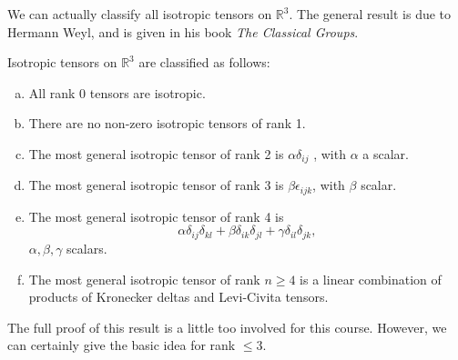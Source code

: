We can actually classify all isotropic tensors on $\mathbb{R}^{3} .$ The general result is due to Hermann Weyl, and is given in his book \textit{The Classical Groups}.

\begin{proposition}
    Isotropic tensors on $ \mathbb{R}^{3} $ are classified as follows:
    \begin{enumerate}[(a)]
        \item All rank 0 tensors are isotropic.
        \item There are no non-zero isotropic tensors of rank 1.
        \item The most general isotropic tensor of rank 2 is $ \alpha \delta_{ij} $ , with $ \alpha $ a scalar.
        \item The most general isotropic tensor of rank 3 is $ \beta \epsilon_{ijk} $, with $ \beta $ scalar.
        \item The most general isotropic tensor of rank 4 is 
        \[
            \alpha \delta_{ij}\delta_{kl}+\beta \delta_{ik}\delta_{jl}+\gamma \delta_{il}\delta_{jk},
        \]
        $ \alpha,\beta,\gamma $ scalars.
        \item The most general isotropic tensor of rank $n \ge 4$ is a linear combination of products
        of Kronecker deltas and Levi-Civita tensors.
    \end{enumerate}
\end{proposition}

The full proof of this result is a little too involved for this course. However, we can
certainly give the basic idea for rank $\le 3$.

